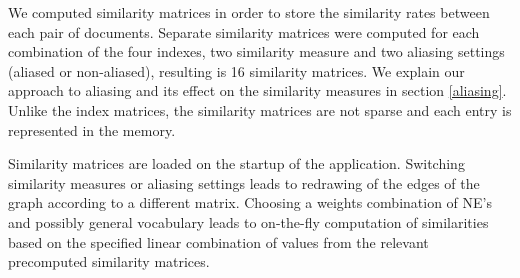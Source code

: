 We computed similarity matrices in order to store the similarity rates between each pair of documents. Separate similarity matrices were computed for each combination of the four indexes, two similarity measure and two aliasing settings (aliased or non-aliased), resulting is 16 similarity matrices. We explain our approach to aliasing and its effect on the similarity measures in section \ref{aliasing}. Unlike the index matrices, the similarity matrices are not sparse and each entry is represented in the memory.

Similarity matrices are loaded on the startup of the application. Switching similarity measures or aliasing settings leads to redrawing of the edges of the graph according to a different matrix. Choosing a weights combination of NE's and possibly general vocabulary leads to on-the-fly computation of similarities based on the specified linear combination of values from the relevant precomputed similarity matrices.



